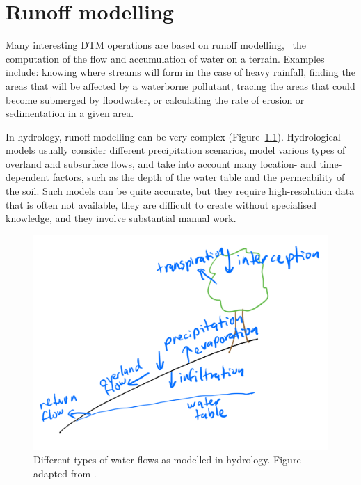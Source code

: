 

\graphicspath{{runoff/}}




\chapter{Runoff modelling}%
\label{chap:runoff}

Many interesting DTM operations are based on runoff modelling, \ie\ the computation of the flow and accumulation of water on a terrain.
Examples include: knowing where streams will form in the case of heavy rainfall, finding the areas that will be affected by a waterborne pollutant, tracing the areas that could become submerged by floodwater, or calculating the rate of erosion or sedimentation in a given area.

In hydrology, runoff modelling can be very complex (Figure~\ref{fig:hydrology}).
Hydrological models usually consider different precipitation scenarios, model various types of overland and subsurface flows, and take into account many location- and time-dependent factors, such as the depth of the water table and the permeability of the soil.
Such models can be quite accurate, but they require high-resolution data that is often not available, they are difficult to create without specialised knowledge, and they involve substantial manual work.

\begin{figure}
\centering
\includegraphics[width=0.95\linewidth]{figs/hydrology.pdf}
\caption{Different types of water flows as modelled in hydrology. Figure adapted from \citet{Beven12}.}%
\label{fig:hydrology}
\end{figure}

